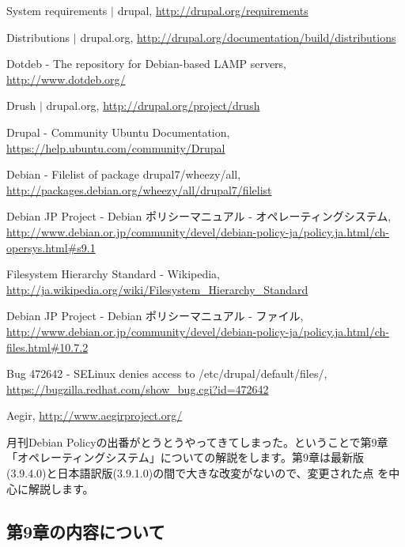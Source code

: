 \documentclass[mingoth,a4paper]{jsarticle}
\begin{document}
\begin{thebibliography}{9}

System requirements $|$ drupal, \url{http://drupal.org/requirements}

Distributions $|$ drupal.org, \url{http://drupal.org/documentation/build/distributions}

Dotdeb - The repository for Debian-based LAMP servers, \url{http://www.dotdeb.org/}

Drush $|$ drupal.org, \url{http://drupal.org/project/drush}

Drupal - Community Ubuntu Documentation, \url{https://help.ubuntu.com/community/Drupal}

Debian - Filelist of package drupal7/wheezy/all, \url{http://packages.debian.org/wheezy/all/drupal7/filelist}

Debian JP Project - Debian ポリシーマニュアル - オペレーティングシステム, \url{http://www.debian.or.jp/community/devel/debian-policy-ja/policy.ja.html/ch-opersys.html\#s9.1}

Filesystem Hierarchy Standard - Wikipedia, \url{http://ja.wikipedia.org/wiki/Filesystem_Hierarchy_Standard}

Debian JP Project - Debian ポリシーマニュアル - ファイル, \url{http://www.debian.or.jp/community/devel/debian-policy-ja/policy.ja.html/ch-files.html\#10.7.2}

Bug 472642 - SELinux denies access to /etc/drupal/default/files/, \url{https://bugzilla.redhat.com/show_bug.cgi?id=472642}

Aegir, \url{http://www.aegirproject.org/}

\end{thebibliography}



月刊Debian Policyの出番がとうとうやってきてしまった。ということで第9章
「オペレーティングシステム」についての解説をします。第9章は最新版
(3.9.4.0)と日本語訳版(3.9.1.0)の間で大きな改変がないので、変更された点
を中心に解説します。

\subsection{第9章の内容について}
\end{document}
